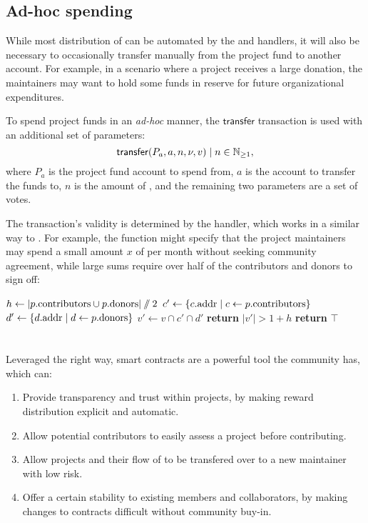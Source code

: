 \subsection{Ad-hoc spending}

While most distribution of \oscoin{} can be automated by the
 and  handlers, it will also be
necessary to occasionally transfer \oscoin{} manually from the project fund to
another account. For example, in a scenario where a project receives a large
donation, the maintainers may want to hold some funds in reserve for future
organizational expenditures.

To spend project funds in an \emph{ad-hoc} manner, the $\mathsf{transfer}$
transaction is used with an additional set of parameters:
\[
    \mathsf{transfer}\lparen P_a, a, n, \nu, v\rparen \mid n \in \mathbb{N}_{\geq 1},
\]
where $P_a$ is the project fund account to spend from, $a$ is the account to
transfer the funds to, $n$ is the amount of \oscoin{}, and the remaining two
parameters are a set of votes.

The transaction's validity is determined by the  handler,
which works in a similar way to . For
example, the function might specify that the project maintainers may spend a small
amount $x$ of \oscoin{} per month without seeking community agreement, while
large sums require over half of the contributors and donors to sign off:
\medskip
\begin{algorithmic}[0]
            \State $h \gets |p.{\mathrm{contributors}} \cup p.{\mathrm{donors}}| \sslash 2$
            \State $c' \gets \{ c.{\mathrm{addr}} \mid c \gets p.{\mathrm{contributors}} \}$
            \State $d' \gets \{ d.{\mathrm{addr}} \mid d \gets p.{\mathrm{donors}} \}$
            \State $v' \gets v \cap c' \cap d'$
            \State \textbf{return} $|v'| > 1 + h$
            \Else
            \State \textbf{return} $\top$
        \EndIf
    \EndProcedure
\end{algorithmic}

\section*{}

Leveraged the right way, smart contracts are a powerful tool the community has,
which can:

\begin{enumerate}
    \item Provide transparency and trust within projects, by making reward
        distribution explicit and automatic.
    \item Allow potential contributors to easily assess a project before contributing.
    \item Allow projects and their flow of \oscoin{} to be transfered over to a
        new maintainer with low risk.
    \item Offer a certain stability to existing members and collaborators, by
        making changes to contracts difficult without community buy-in.
\end{enumerate}
